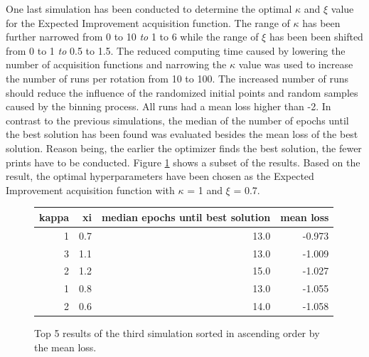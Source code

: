 One last simulation has been conducted to determine the optimal $\kappa$ and $\xi$ value for the Expected Improvement acquisition function. The range of $\kappa$ has been further narrowed from 0 to 10 \textit{to} 1 to 6 while the range of $\xi$ has been been shifted from 0 to 1 \textit{to} 0.5 to 1.5. The reduced computing time caused by lowering the number of acquisition functions and narrowing the $\kappa$ value was used to increase the number of runs per rotation from 10 to 100. The increased number of runs should reduce the influence of the randomized initial points and random samples caused by the binning process. All runs had a mean loss higher than -2. In contrast to the previous simulations, the median of the number of epochs until the best solution has been found was evaluated besides the mean loss of the best solution. Reason being, the earlier the optimizer finds the best solution, the fewer prints have to be conducted. Figure \ref{figure/simulation3} shows a subset of the results. Based on the result, the optimal hyperparameters have been chosen as the Expected Improvement acquisition function with $\kappa$ = 1 and $\xi$ = 0.7.

\begin{figure}
    \centering
    \begin{tabular}{rrrr}
    \toprule
     kappa &  xi &  median epochs until best solution &  mean loss \\
    \midrule
         1 & 0.7 &                  13.0 &     -0.973 \\
         3 & 1.1 &                  13.0 &     -1.009 \\
         2 & 1.2 &                  15.0 &     -1.027 \\
         1 & 0.8 &                  13.0 &     -1.055 \\
         2 & 0.6 &                  14.0 &     -1.058 \\
    \bottomrule
    \end{tabular}
    \caption{Top 5 results of the third simulation sorted in ascending order by the mean loss.}
    \label{figure/simulation3}
\end{figure}